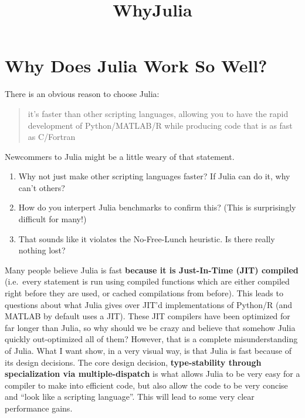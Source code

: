 \documentclass[11pt]{article}
\title{WhyJulia}
\begin{document}
    
    
    \maketitle
    
    

    
    \section{Why Does Julia Work So
Well?}\label{why-does-julia-work-so-well}

There is an obvious reason to choose Julia:

\begin{quote}
it's faster than other scripting languages, allowing you to have the
rapid development of Python/MATLAB/R while producing code that is as
fast as C/Fortran
\end{quote}

Newcommers to Julia might be a little weary of that statement.

\begin{enumerate}
\def\labelenumi{\arabic{enumi}.}
\itemsep1pt\parskip0pt
\item
  Why not just make other scripting languages faster? If Julia can do
  it, why can't others?
\item
  How do you interpert Julia benchmarks to confirm this? (This is
  surprisingly difficult for many!)
\item
  That sounds like it violates the No-Free-Lunch heuristic. Is there
  really nothing lost?
\end{enumerate}

Many people believe Julia is fast \textbf{because it is Just-In-Time
(JIT) compiled} (i.e.~every statement is run using compiled functions
which are either compiled right before they are used, or cached
compilations from before). This leads to questions about what Julia
gives over JIT'd implementations of Python/R (and MATLAB by default uses
a JIT). These JIT compilers have been optimized for far longer than
Julia, so why should we be crazy and believe that somehow Julia quickly
out-optimized all of them? However, that is a complete misunderstanding
of Julia. What I want show, in a very visual way, is that Julia is fast
because of its design decisions. The core design decision,
\textbf{type-stability through specialization via multiple-dispatch} is
what allows Julia to be very easy for a compiler to make into efficient
code, but also allow the code to be very concise and ``look like a
scripting language''. This will lead to some very clear performance
gains.
\end{document}

